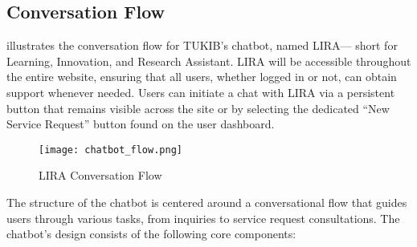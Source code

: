 \subsection{Conversation Flow}

 illustrates the conversation flow for TUKIB's chatbot, named LIRA— short for Learning, Innovation, and Research Assistant. LIRA will be accessible throughout the entire website, ensuring that all users, whether logged in or not, can obtain support whenever needed. Users can initiate a chat with LIRA via a persistent button that remains visible across the site or by selecting the dedicated “New Service Request” button found on the user dashboard.

\newpage

\begin{figure}[h]
	\centering 
	\texttt{[image: chatbot\_flow.png]}
	\caption{LIRA Conversation Flow}
	\label{fig:chatbot_flow}
\end{figure}

The structure of the chatbot is centered around a conversational flow that guides users through various tasks, from inquiries to service request consultations. The chatbot’s design consists of the following core components:


